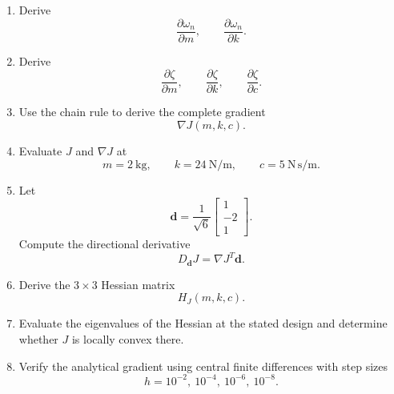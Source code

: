 \begin{enumerate}
    \item Derive
    \begin{equation}
    \frac{\partial\omega_n}{\partial m},
    \qquad
    \frac{\partial\omega_n}{\partial k}.
    \end{equation}

    \item Derive
    \begin{equation}
    \frac{\partial\zeta}{\partial m},
    \qquad
    \frac{\partial\zeta}{\partial k},
    \qquad
    \frac{\partial\zeta}{\partial c}.
    \end{equation}

    \item Use the chain rule to derive the complete gradient
    \begin{equation}
    \nabla J(m,k,c).
    \end{equation}

    \item Evaluate $J$ and $\nabla J$ at
    \begin{equation}
    m=2~\mathrm{kg},
    \qquad
    k=24~\mathrm{N/m},
    \qquad
    c=5~\mathrm{N\,s/m}.
    \end{equation}

    \item Let
    \begin{equation}
    \mathbf{d}
    =
    \frac{1}{\sqrt{6}}
    \begin{bmatrix}
    1\\
    -2\\
    1
    \end{bmatrix}.
    \end{equation}
    Compute the directional derivative
    \begin{equation}
    D_{\mathbf{d}}J
    =
    \nabla J^T\mathbf{d}.
    \end{equation}

    \item Derive the $3\times3$ Hessian matrix
    \begin{equation}
    H_J(m,k,c).
    \end{equation}

    \item Evaluate the eigenvalues of the Hessian at the stated design and
    determine whether $J$ is locally convex there.

    \item Verify the analytical gradient using central finite differences
    with step sizes
    \begin{equation}
    h=10^{-2},\ 10^{-4},\ 10^{-6},\ 10^{-8}.
    \end{equation}
\end{enumerate}



